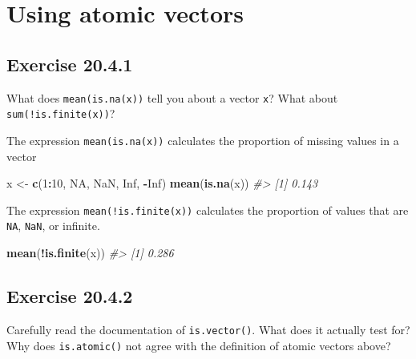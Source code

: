 \documentclass[]{book}
\newenvironment{Shaded}{\begin{snugshade}}{\end{snugshade}}
\newcommand{\CommentTok}[1]{\textcolor[rgb]{0.56,0.35,0.01}{\textit{#1}}}
\newcommand{\DecValTok}[1]{\textcolor[rgb]{0.00,0.00,0.81}{#1}}
\newcommand{\KeywordTok}[1]{\textcolor[rgb]{0.13,0.29,0.53}{\textbf{#1}}}
\newcommand{\NormalTok}[1]{#1}
\newcommand{\OperatorTok}[1]{\textcolor[rgb]{0.81,0.36,0.00}{\textbf{#1}}}
\newcommand{\OtherTok}[1]{\textcolor[rgb]{0.56,0.35,0.01}{#1}}
\newcommand{\StringTok}[1]{\textcolor[rgb]{0.31,0.60,0.02}{#1}}
\theoremstyle{plain}
\theoremstyle{remark}
\begin{document}
\hypertarget{using-atomic-vectors}{%
\section{Using atomic vectors}\label{using-atomic-vectors}}

\hypertarget{exercise-20.4.1}{%
\subsection*{\texorpdfstring{Exercise
{20.4.1}}{Exercise 20.4.1}}\label{exercise-20.4.1}}

What does \texttt{mean(is.na(x))} tell you about a vector \texttt{x}?
What about \texttt{sum(!is.finite(x))}?

The expression \texttt{mean(is.na(x))} calculates the proportion of
missing values in a vector

\begin{Shaded}
\begin{Highlighting}[]
\NormalTok{x <-}\StringTok{ }\KeywordTok{c}\NormalTok{(}\DecValTok{1}\OperatorTok{:}\DecValTok{10}\NormalTok{, }\OtherTok{NA}\NormalTok{, }\OtherTok{NaN}\NormalTok{, }\OtherTok{Inf}\NormalTok{, }\OperatorTok{-}\OtherTok{Inf}\NormalTok{)}
\KeywordTok{mean}\NormalTok{(}\KeywordTok{is.na}\NormalTok{(x))}
\CommentTok{#> [1] 0.143}
\end{Highlighting}
\end{Shaded}

The expression \texttt{mean(!is.finite(x))} calculates the proportion of
values that are \texttt{NA}, \texttt{NaN}, or infinite.

\begin{Shaded}
\begin{Highlighting}[]
\KeywordTok{mean}\NormalTok{(}\OperatorTok{!}\KeywordTok{is.finite}\NormalTok{(x))}
\CommentTok{#> [1] 0.286}
\end{Highlighting}
\end{Shaded}

\hypertarget{exercise-20.4.2}{%
\subsection*{\texorpdfstring{Exercise
{20.4.2}}{Exercise 20.4.2}}\label{exercise-20.4.2}}

Carefully read the documentation of \texttt{is.vector()}. What does it
actually test for? Why does \texttt{is.atomic()} not agree with the
definition of atomic vectors above?
\end{document}
